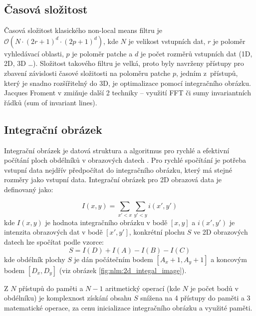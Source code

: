 \subsection*{Časová složitost}
Časová složitost klasického non-local means filtru je $\mathcal{O}(N \cdot (2r + 1)^d \cdot (2p + 1)^d)$, kde $N$ je velikost vstupních dat, $r$ je poloměr vyhledávací oblasti, $p$ je poloměr patche a $d$ je počet rozměrů vstupních dat (1D, 2D, 3D \dots). Složitost takového filtru je velká, proto byly navrženy přístupy pro zbavení závislosti časové složitosti na poloměru patche $p$, jedním z~přístupů, který je snadno rozšířitelný do 3D, je optimalizace pomocí integračního obrázku. Jacques Froment v \cite{nlm2014:froment} zmiňuje další 2 techniky -- využití FFT či sumy invariantních řádků (sum of invariant lines). 

\subsection*{Integrační obrázek}
\label{subsec:theory:nlm:integra_image}
Integrační obrázek je datová struktura a algoritmus pro rychlé a efektivní počítání ploch obdélníků v obrazových datech \cite{wiki:integral_image}. Pro rychlé spočítání je potřeba vstupní data nejdřív předpočítat do integračního obrázku, který má stejné rozměry jako vstupní data. Integrační obrázek pro 2D obrazová data je definovaný jako:

\begin{equation}
I(x, y) = \displaystyle\sum_{x'<x}{\displaystyle\sum_{y'<y}{i(x', y')}}
\end{equation}
kde $I(x, y)$ je hodnota integračního obrázku v bodě $[x, y]$ a $i(x', y')$ je intenzita obrazových dat v bodě $[x', y']$, konkrétní plochu $S$ ve 2D obrazových datech lze spočítat podle vzorce: 
\begin{equation}
    \label{eq:2dint:area}
    S = I(D) + I(A) - I(B) - I(C)
\end{equation}
kde obdélník plochy $S$ je dán počátečním bodem $[A_x + 1, A_y + 1]$ a koncovým bodem $[D_x, D_y]$ (viz obrázek \ref{fig:nlm:2d_integal_image}).

Z $N$ přístupů do paměti a $N - 1$ aritmetický operací (kde $N$ je počet bodů v obdélníku) je komplexnost získání obsahu $S$ snížena na 4 přístupy do paměti a 3 matematické operace, za cenu inicializace integračního obrázku a využité paměti.

